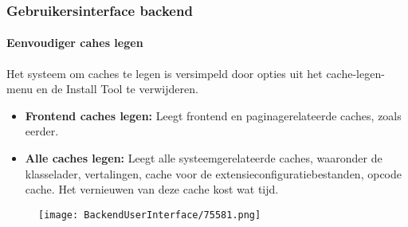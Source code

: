 \begin{frame}[fragile]
	\frametitle{Gebruikersinterface backend}
	\framesubtitle{Eenvoudiger cahes legen}

	Het systeem om caches te legen is versimpeld door opties uit het cache-legen-menu en de
	Install Tool te verwijderen.

	\begin{itemize}

		\item \textbf{Frontend caches legen:}\newline
			\small
				Leegt frontend en paginagerelateerde caches, zoals eerder.
			\normalsize

		\item \textbf{Alle caches legen:}\newline
			\small
				Leegt alle systeemgerelateerde caches, waaronder de klasselader, vertalingen,
				cache voor de extensieconfiguratiebestanden, opcode cache. Het vernieuwen van
				deze cache kost wat tijd.
			\normalsize

	\end{itemize}

	\begin{figure}
		\texttt{[image: BackendUserInterface/75581.png]}
	\end{figure}

\end{frame}

